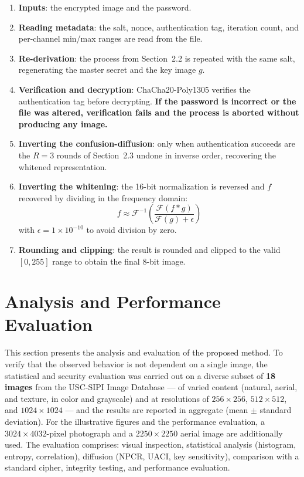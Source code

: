 \documentclass{llncs}
\begin{document}
\begin{enumerate}
  \item \textbf{Inputs}: the encrypted image and the password.
  \item \textbf{Reading metadata}: the salt, nonce, authentication tag,
    iteration count, and per-channel min/max ranges are read from the file.
  \item \textbf{Re-derivation}: the process from Section~2.2 is repeated with
    the same salt, regenerating the master secret and the key image $g$.
  \item \textbf{Verification and decryption}: ChaCha20-Poly1305 verifies the
    authentication tag before decrypting. \textbf{If the password is
    incorrect or the file was altered, verification fails and the process is
    aborted without producing any image.}
  \item \textbf{Inverting the confusion-diffusion}: only when authentication
    succeeds are the $R=3$ rounds of Section~2.3 undone in inverse order,
    recovering the whitened representation.
  \item \textbf{Inverting the whitening}: the 16-bit normalization is
    reversed and $f$ recovered by dividing in the frequency domain:
    \[
    f \approx \mathcal{F}^{-1}\left(\frac{\mathcal{F}(f * g)}{\mathcal{F}(g) + \epsilon}\right)
    \]
    with $\epsilon = 1\times10^{-10}$ to avoid division by zero.
  \item \textbf{Rounding and clipping}: the result is rounded and clipped to
    the valid $[0,255]$ range to obtain the final 8-bit image.
\end{enumerate}

\section{Analysis and Performance Evaluation}

This section presents the analysis and evaluation of the proposed method. To
verify that the observed behavior is not dependent on a single image, the
statistical and security evaluation was carried out on a diverse subset of
\textbf{18 images} from the USC-SIPI Image Database \cite{sipi} --- of varied
content (natural, aerial, and texture, in color and grayscale) and at
resolutions of $256\times256$, $512\times512$, and $1024\times1024$ --- and
the results are reported in aggregate (mean $\pm$ standard deviation). For the
illustrative figures and the performance evaluation, a $3024\times4032$-pixel
photograph and a $2250\times2250$ aerial image are additionally used. The
evaluation comprises: visual inspection, statistical analysis (histogram,
entropy, correlation), diffusion (NPCR, UACI, key sensitivity), comparison
with a standard cipher, integrity testing, and performance evaluation.
\end{document}
